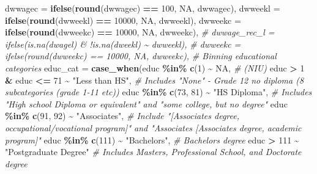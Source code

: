 \documentclass[
]{article}
\newenvironment{Shaded}{\begin{snugshade}}{\end{snugshade}}
\newcommand{\AttributeTok}[1]{\textcolor[rgb]{0.13,0.29,0.53}{#1}}
\newcommand{\CommentTok}[1]{\textcolor[rgb]{0.56,0.35,0.01}{\textit{#1}}}
\newcommand{\ConstantTok}[1]{\textcolor[rgb]{0.56,0.35,0.01}{#1}}
\newcommand{\DecValTok}[1]{\textcolor[rgb]{0.00,0.00,0.81}{#1}}
\newcommand{\FunctionTok}[1]{\textcolor[rgb]{0.13,0.29,0.53}{\textbf{#1}}}
\newcommand{\NormalTok}[1]{#1}
\newcommand{\SpecialCharTok}[1]{\textcolor[rgb]{0.81,0.36,0.00}{\textbf{#1}}}
\newcommand{\StringTok}[1]{\textcolor[rgb]{0.31,0.60,0.02}{#1}}
\begin{document}
\begin{Shaded}
\begin{Highlighting}[]
         \AttributeTok{dwwagec =} \FunctionTok{ifelse}\NormalTok{(}\FunctionTok{round}\NormalTok{(dwwagec) }\SpecialCharTok{==} \DecValTok{100}\NormalTok{, }\ConstantTok{NA}\NormalTok{, dwwagec),}
         \AttributeTok{dwweekl =} \FunctionTok{ifelse}\NormalTok{(}\FunctionTok{round}\NormalTok{(dwweekl) }\SpecialCharTok{==} \DecValTok{10000}\NormalTok{, }\ConstantTok{NA}\NormalTok{, dwweekl),}
         \AttributeTok{dwweekc =} \FunctionTok{ifelse}\NormalTok{(}\FunctionTok{round}\NormalTok{(dwweekc) }\SpecialCharTok{==} \DecValTok{10000}\NormalTok{, }\ConstantTok{NA}\NormalTok{, dwweekc),}
         \CommentTok{\# dwwage\_rec\_l = ifelse(is.na(dwagel) \& !is.na(dweekl) \textasciitilde{} dwweekl),}
         \CommentTok{\# dwweekc = ifelse(round(dwweekc) == 10000, NA, dwweekc),}
         \CommentTok{\# Binning educational categories}
         \AttributeTok{educ\_cat =} \FunctionTok{case\_when}\NormalTok{(educ }\SpecialCharTok{\%in\%} \FunctionTok{c}\NormalTok{(}\DecValTok{1}\NormalTok{) }\SpecialCharTok{\textasciitilde{}} \ConstantTok{NA}\NormalTok{, }\CommentTok{\# (NIU)}
\NormalTok{                              educ }\SpecialCharTok{\textgreater{}} \DecValTok{1} \SpecialCharTok{\&}\NormalTok{ educ }\SpecialCharTok{\textless{}=} \DecValTok{71} \SpecialCharTok{\textasciitilde{}} \StringTok{"Less than HS"}\NormalTok{, }\CommentTok{\# Includes "None" {-} Grade 12 no diploma (8 subcategories (grade 1{-}11 etc))}
\NormalTok{                              educ }\SpecialCharTok{\%in\%} \FunctionTok{c}\NormalTok{(}\DecValTok{73}\NormalTok{, }\DecValTok{81}\NormalTok{) }\SpecialCharTok{\textasciitilde{}} \StringTok{"HS Diploma"}\NormalTok{, }\CommentTok{\# Includes "High school Diploma or equivalent" and "some college, but no degree"}
\NormalTok{                              educ }\SpecialCharTok{\%in\%} \FunctionTok{c}\NormalTok{(}\DecValTok{91}\NormalTok{, }\DecValTok{92}\NormalTok{) }\SpecialCharTok{\textasciitilde{}} \StringTok{"Associate\textquotesingle{}s"}\NormalTok{, }\CommentTok{\# Include "[Associate\textquotesingle{}s degree, occupational/vocational program]" and "Associate\textquotesingle{}s         [Associate\textquotesingle{}s degree, academic program]"}
\NormalTok{                              educ }\SpecialCharTok{\%in\%} \FunctionTok{c}\NormalTok{(}\DecValTok{111}\NormalTok{) }\SpecialCharTok{\textasciitilde{}} \StringTok{"Bachelor\textquotesingle{}s"}\NormalTok{, }\CommentTok{\# Bachelor\textquotesingle{}s degree}
\NormalTok{                              educ }\SpecialCharTok{\textgreater{}} \DecValTok{111} \SpecialCharTok{\textasciitilde{}} \StringTok{"Postgraduate Degree"} \CommentTok{\# Includes Master\textquotesingle{}s, Professional School, and Doctorate degree}

\end{Highlighting}
\end{Shaded}
\end{document}
